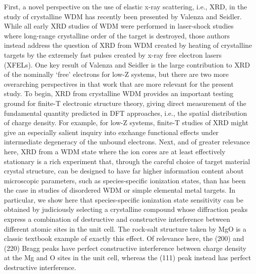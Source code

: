 First, a novel perspective on the use of elastic x-ray scattering, i.e.,
XRD, in the study of crystalline WDM has recently been presented by
Valenza and Seidler. \cite{VALENZA2016WARM} While all early XRD studies of WDM were
performed in laser-shock studies where long-range crystalline order of
the target is destroyed, \cite{MA2013X} those authors instead address the
question of XRD from WDM created by heating of crystalline targets by
the extremely fast pulses created by x-ray free electron lasers (XFELs).
One key result of Valenza and Seidler is the large contribution to XRD
of the nominally `free' electrons for low-Z systems, but there are two
more overarching perspectives in that work that are more relevant for
the present study. To begin, XRD from crystalline WDM provides an
important testing ground for finite-T electronic structure theory,
giving direct measurement of the fundamental quantity predicted in DFT
approaches, i.e., the spatial distribution of charge density. For
example, for low-Z systems, finite-T studies of XRD might give an
especially salient inquiry into exchange functional effects under
intermediate degeneracy of the unbound electrons. \cite{KARASIEV2012COMPARISON, DUFTY2011SCALING, SJOSTROM2012TEMPERATURE} Next, and
of greater relevance here, XRD from a WDM state where the ion cores are
at least effectively stationary is a rich experiment that, through the
careful choice of target material crystal structure, can be designed to
have far higher information content about microscopic parameters, such
as species-specific ionization states, than has been the case in studies
of disordered WDM or simple elemental metal targets. In particular, we
show here that species-specific ionization state sensitivity can be
obtained by judiciously selecting a crystalline compound whose
diffraction peaks express a combination of destructive and constructive
interference between different atomic sites in the unit cell. The
rock-salt structure taken by MgO is a classic textbook example of
exactly this effect. Of relevance here, the (200) and (220) Bragg peaks
have perfect constructive interference between charge density at the Mg
and O sites in the unit cell, whereas the (111) peak instead has perfect
destructive interference.

